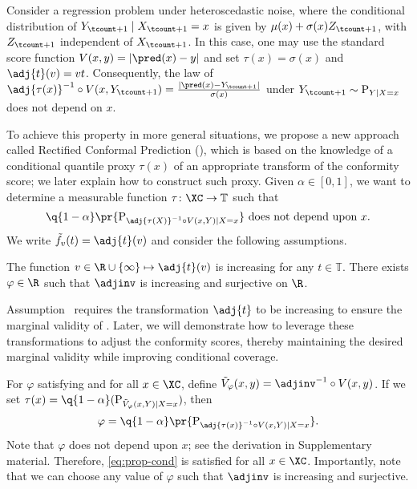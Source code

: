   \begin{example}
    Consider a regression problem under heteroscedastic noise, where the conditional distribution of $Y_{\tcount+1} \mid X_{\tcount+1} = x$ is given by $\mu(x) + \sigma(x) Z_{\tcount+1}$, with $Z_{\tcount+1}$ independent of $X_{\tcount+1}$. In this case, one may use the standard score function $V(x, y) = |\pred(x) - y|$ and set $\tau(x)=\sigma(x)$ and $\adj{t}(v) = v t$. Consequently, the law of $\adj{\tau(x)}^{-1} \circ V(x,Y_{\tcount+1}) = \frac{|\pred(x) - Y_{\tcount+1}|}{\sigma(x)}$ under $Y_{\tcount+1}\sim \textup{P}_{Y\mid X=x}$ does not depend on $x$.
  \end{example}

  To achieve this property in more general situations, we propose a new approach called Rectified Conformal Prediction (\RCP), which is based on the knowledge of a conditional quantile proxy $\tau(x)$ of an appropriate transform of the conformity score; we later explain how to construct such proxy.
  Given $\alpha\in[0,1]$, we want to determine a measurable function $\tau \colon \XC\to \mathbb{T}$ such that
  \begin{equation}\label{eq:prop-cond}
    \q{1-\alpha}\pr{\textup{P}_{\adj{\tau(X)}^{-1}\circ V(x,Y)\mid X=x}} ~ \text{does not depend upon} ~ x.
  \end{equation}
  We write $\tilde{f}_{v}(t)=\adj{t}(v)$ and consider the following assumptions.

  \begin{assumption}\label{ass:tau}
    The function $v\in\R \cup\{\infty\}\mapsto \adj{t}(v)$ is increasing for any $t\in\mathbb{T}$.
    There exists $\varphi\in\R$ such that $\adjinv$ is increasing and surjective on $\R$.
  \end{assumption}

  Assumption~ requires the transformation \( \adj{t} \) to be increasing to ensure the marginal validity of \RCP. Later, we will demonstrate how to leverage these transformations to adjust the conformity scores, thereby maintaining the desired marginal validity while improving conditional coverage.

  For \(\varphi\) satisfying  and for all \(x \in \XC\), define $\tilde{V}_{\varphi}(x,y)=\adjinv^{-1}\circ V(x,y)$. If we set $\tau(x) = \q{1-\alpha}(\textup{P}_{\tilde{V}_{\varphi}(x,Y)\mid X=x})$, then
  \begin{equation}\label{eq:eq:varphi-quantile}
    \varphi
    = \q{1-\alpha}\pr{\textup{P}_{\adj{\tau(x)}^{-1} \circ V(x,Y)\mid X=x}}.
  \end{equation}
  Note that \(\varphi\) does not depend upon \(x\); see the derivation in Supplementary material. Therefore, \eqref{eq:prop-cond} is satisfied for all $x \in \XC$. Importantly, note that we can choose any value of $\varphi$ such that $\adjinv$ is increasing and surjective.


